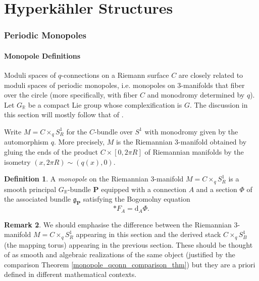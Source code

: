 \documentclass[11pt, oneside, reqno]{amsart}
\theoremstyle{definition} \newtheorem{definition}{Definition}[section]
\theoremstyle{definition} \newtheorem{remark}[definition]{Remark}
\theoremstyle{definition} \newtheorem{remarks}[definition]{Remarks}
\theoremstyle{definition} \newtheorem{question}[definition]{Question}
\theoremstyle{definition} \newtheorem*{note}{Note}
\theoremstyle{definition} \newtheorem{example}[definition]{Example}
\theoremstyle{definition} \newtheorem{examples}[definition]{Examples}
\renewcommand{\gg}{\mathfrak{g}}
\newcommand{\bo}[1]{\boldsymbol{#1}}
\newcommand{\RR}{\mathbb{R}}
\renewcommand{\d}{\mathrm{d}}
\begin{document}
\part{Hyperk\"ahler Structures} \label{part2}

\section{Periodic Monopoles} \label{periodic_monopole_section}
\subsection{Monopole Definitions}
Moduli spaces of $q$-connections on a Riemann surface $C$ are closely related to moduli spaces of periodic monopoles, i.e. monopoles on 3-manifolds that fiber over the circle (more specifically, with fiber $C$ and monodromy determined by $q$).  Let $G_\RR$ be a compact Lie group whose complexification is $G$.  The discussion in this section will mostly follow that of \cite{CharbonneauHurtubise, Smith}.

Write $M = C\times_q S^1_R$ for the $C$-bundle over $S^1$ with monodromy given by the automorphism $q$.  More precisely, $M$ is the Riemannian 3-manifold obtained by gluing the ends of the product $C \times [0,2\pi R]$ of Riemannian manifolds by the isometry $(x,2\pi R) \sim (q(x), 0)$.

\begin{definition}
A \emph{monopole} on the Riemannian 3-manifold $M = C \times_q S^1_R$ is a smooth principal $G_\RR$-bundle $\bo P$ equipped with a connection $A$ and a section $\Phi$ of the associated bundle $\gg_{\bo P}$ satisfying the Bogomolny equation 
\[\ast F_A = \d_A \Phi.\]
\end{definition}

\begin{remark}
We should emphasise the difference between the Riemannian 3-manifold $M = C \times_q S^1_R$ appearing in this section and the derived stack $C \times_q S^1_B$ (the mapping torus) appearing in the previous section.  These should be thought of as smooth and algebraic realizations of the same object (justified by the comparison Theorem \ref{monopole_qconn_comparison_thm}) but they are a priori defined in different mathematical contexts.
\end{remark}
\end{document}
